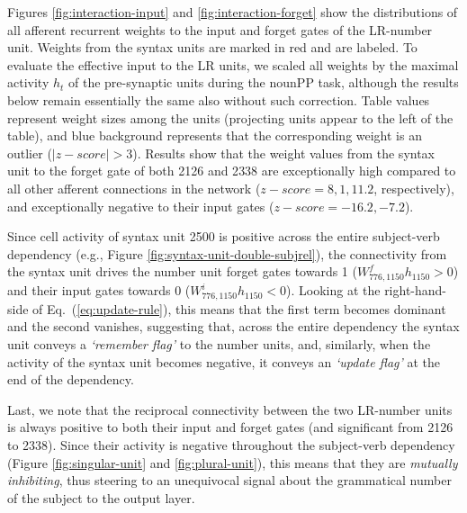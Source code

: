 
Figures \ref{fig:interaction-input} and \ref{fig:interaction-forget} show the distributions of all afferent recurrent weights to the input and forget gates of the LR-number unit. Weights from the syntax units are marked in red and are labeled. To evaluate the effective input to the LR units, we scaled all weights by the maximal activity $h_t$ of the pre-synaptic units during the nounPP task, although the results below remain essentially the same also without such correction. Table values represent weight sizes among the units (projecting units appear to the left of the table), and blue background represents that the corresponding weight is an outlier ($|z-score|>3$). Results show that the weight values from the syntax unit to the forget gate of both \unit{2}{126} and \unit{2}{338} are exceptionally high compared to all other afferent connections in the network ($z-score=8,1, 11.2$, respectively), and exceptionally negative to their input gates ($z-score=-16.2, -7.2$).

Since cell activity of syntax unit \unit{2}{500} is positive across the entire
subject-verb dependency (e.g., Figure
\ref{fig:syntax-unit-double-subjrel}), the connectivity from the
syntax unit drives the number unit forget gates towards 1
($W^f_{776, 1150}h_{1150}>0$) and their input gates towards 0
($W^i_{776, 1150}h_{1150}<0$). Looking at the right-hand-side of
Eq.~(\ref{eq:update-rule}), this means that the first term becomes
  dominant and the second vanishes, suggesting that, across the entire
  dependency the syntax unit conveys a \textit{`remember flag'}
  to the number units, and, similarly, when the activity of the syntax
  unit becomes negative, it conveys an \textit{`update
    flag'} at the end of the dependency.

Last, we note that the reciprocal connectivity between the two LR-number units is always positive to both their input and forget gates (and significant from  \unit{2}{126} to \unit{2}{338}). Since their activity is negative throughout the subject-verb dependency (Figure \ref{fig:singular-unit} and \ref{fig:plural-unit}), this means that they are \textit{mutually inhibiting}, thus steering to an unequivocal signal about the grammatical number of the subject to the output layer.

